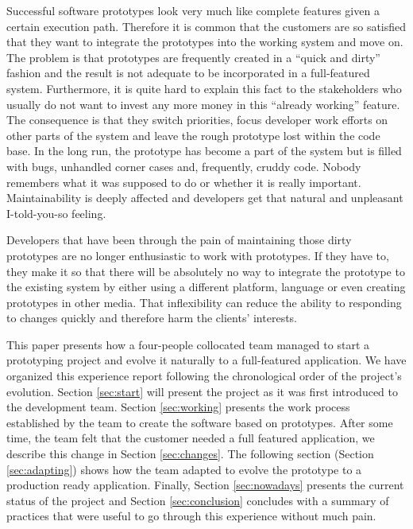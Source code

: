\documentclass[lnbip]{svmultln}
\begin{document}
Successful software prototypes look very much like complete features
given a certain execution path. Therefore it is common that the
customers are so satisfied that they want to integrate the prototypes
into the working system and move on. The problem is that prototypes
are frequently created in a ``quick and dirty'' fashion and the result
is not adequate to be incorporated in a full-featured
system. Furthermore, it is quite hard to explain this fact to the
stakeholders who usually do not want to invest any more money in this
``already working'' feature. The consequence is that they switch
priorities, focus developer work efforts on other parts of the system
and leave the rough prototype lost within the code base. In the long
run, the prototype has become a part of the system but is filled with
bugs, unhandled corner cases and, frequently, cruddy code. Nobody
remembers what it was supposed to do or whether it is really
important. Maintainability is deeply affected and developers get that
natural and unpleasant I-told-you-so feeling. %

Developers that have been through the pain of maintaining those dirty
prototypes are no longer enthusiastic to work with prototypes. If they
have to, they make it so that there will be absolutely no way to
integrate the prototype to the existing system by either using a
different platform, language or even creating prototypes in other
media. That inflexibility can reduce the ability to responding to
changes quickly and therefore harm the clients' interests.

This paper presents how a four-people collocated team managed to start
a prototyping project and evolve it naturally to a full-featured
application.  We have organized this experience report following the
chronological order of the project's evolution. Section
\ref{sec:start} will present the project as it was first introduced to
the development team. Section \ref{sec:working} presents the work
process established by the team to create the software based on
prototypes. After some time, the team felt that the customer needed a
full featured application, we describe this change in Section
\ref{sec:changes}. The following section (Section \ref{sec:adapting})
shows how the team adapted to evolve the prototype to a production
ready application. Finally, Section \ref{sec:nowadays} presents the
current status of the project and Section \ref{sec:conclusion}
concludes with a summary of practices that were useful to go through
this experience without much pain.
\end{document}
